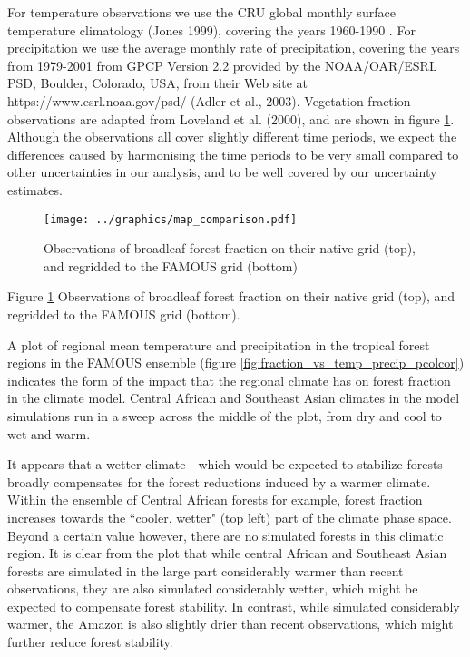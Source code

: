 \documentclass[gmd, manuscript]{copernicus}
\begin{document}
For temperature observations we use the CRU global monthly surface temperature climatology (Jones 1999), covering the years 1960-1990 . For precipitation we use the average monthly rate of precipitation, covering the years from 1979-2001 from GPCP Version 2.2 provided by the NOAA/OAR/ESRL PSD, Boulder, Colorado, USA, from their Web site at https://www.esrl.noaa.gov/psd/ (Adler et al., 2003). Vegetation fraction observations are adapted from Loveland et al. (2000), and are shown in figure \ref{fig:map_comparison}. Although the observations all cover slightly different time periods, we expect the differences caused by harmonising the time periods to be very small compared to other uncertainties in our analysis, and to be well covered by our uncertainty estimates.


\begin{figure}[t]
\texttt{[image: ../graphics/map\_comparison.pdf]}
\caption{Observations of broadleaf forest fraction on their native grid (top), and regridded to the FAMOUS grid (bottom)}
\label{fig:map_comparison}
\end{figure}

Figure \ref{fig:map_comparison} Observations of broadleaf forest fraction on their native grid (top), and regridded to the FAMOUS grid (bottom).

A plot of regional mean temperature and precipitation in the tropical forest regions in the FAMOUS ensemble (figure \ref{fig:fraction_vs_temp_precip_pcolcor}) indicates the form of the impact that the regional climate has on forest fraction in the climate model. Central African and Southeast Asian climates in the model simulations run in a sweep across the middle of the plot, from dry and cool to wet and warm. 

It appears that a wetter climate - which would be expected to stabilize forests - broadly compensates for the forest reductions induced by a warmer climate. Within the ensemble of Central African forests for example, forest fraction increases towards the ``cooler, wetter" (top left) part of the climate phase space. Beyond a certain value however, there are no simulated forests in this climatic region. It is clear from the plot that while central African and Southeast Asian forests are simulated in the large part considerably warmer than recent observations, they are also simulated considerably wetter, which might be expected to compensate forest stability. In contrast, while simulated considerably warmer, the Amazon is also slightly drier than recent observations, which might further reduce forest stability.
\end{document}
